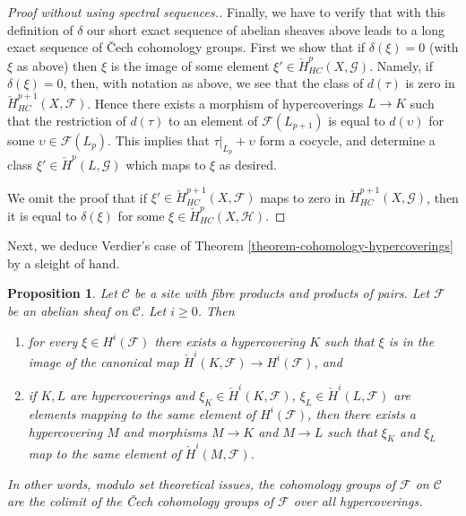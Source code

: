 \documentclass{stacks-project}
\theoremstyle{plain}
\newtheorem{proposition}[subsection]{Proposition}
\theoremstyle{definition}
\theoremstyle{remark}
\numberwithin{equation}{subsection}
\begin{document}
\begin{proof}[Proof without using spectral sequences.]
\medskip\noindent
Finally, we have to verify that with this definition of $\delta$
our short exact sequence of abelian sheaves above leads to a
long exact sequence of {\v C}ech cohomology groups.
First we show that if $\delta(\xi) = 0$ (with $\xi$ as above) then
$\xi$ is the image of some element
$\xi' \in \check{H}^p_{HC}(X, \mathcal{G})$.
Namely, if $\delta(\xi) = 0$, then, with notation as above, we
see that the class of $d(\tau)$ is zero in
$\check{H}^{p + 1}_{HC}(X, \mathcal{F})$. Hence there exists
a morphism of hypercoverings $L \to K$ such that the restriction
of $d(\tau)$ to an element of $\mathcal{F}(L_{p + 1})$ is
equal to $d(\upsilon)$ for some $\upsilon \in \mathcal{F}(L_p)$.
This implies that $\tau|_{L_p} + \upsilon$ form a
cocycle, and determine a class $\xi' \in \check{H}^p(L, \mathcal{G})$
which maps to $\xi$ as desired.

\medskip\noindent
We omit the proof that if $\xi' \in \check{H}^{p + 1}_{HC}(X, \mathcal{F})$
maps to zero in $\check{H}^{p + 1}_{HC}(X, \mathcal{G})$, then it is
equal to $\delta(\xi)$ for some $\xi \in \check{H}^p_{HC}(X, \mathcal{H})$.
\end{proof}

\noindent
Next, we deduce Verdier's case of
Theorem \ref{theorem-cohomology-hypercoverings}
by a sleight of hand.

\begin{proposition}
\label{proposition-cohomology-hypercoverings}
Let $\mathcal{C}$ be a site with fibre products and products of pairs.
Let $\mathcal{F}$ be an abelian sheaf on $\mathcal{C}$.
Let $i \geq 0$. Then
\begin{enumerate}
\item for every $\xi \in H^i(\mathcal{F})$ there exists a hypercovering
$K$ such that $\xi$ is in the image of the canonical map
$\check{H}^i(K, \mathcal{F}) \to H^i(\mathcal{F})$, and
\item if $K, L$ are hypercoverings and $\xi_K \in \check{H}^i(K, \mathcal{F})$,
$\xi_L \in \check{H}^i(L, \mathcal{F})$ are elements mapping
to the same element of $H^i(\mathcal{F})$, then there exists
a hypercovering $M$ and morphisms $M \to K$ and $M \to L$ such
that $\xi_K$ and $\xi_L$ map to the same element of
$\check{H}^i(M, \mathcal{F})$.
\end{enumerate}
In other words, modulo set theoretical issues, the cohomology
groups of $\mathcal{F}$ on $\mathcal{C}$ are the colimit of
the {\v C}ech cohomology groups of $\mathcal{F}$ over all hypercoverings.
\end{proposition}
\end{document}
